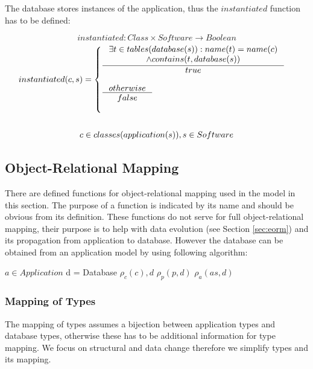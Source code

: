 \documentclass[11pt]{article}
\begin{document}
The database stores instances of the application, thus the $instantiated$ function has to be defined:

$$instantiated : Class \times Software \rightarrow Boolean $$ 
\begin{equation*}
\begin{gathered}
	instantiated(c, s) = \begin{cases}
 \inference{\exists t \in tables(database(s)) : name(t) = name(c) \\ \wedge contains(t, database(s))}{true} \\ \\
  \inference{otherwise}{false} \\ \\
 \end{cases} \\ \\
 c \in classes(application(s)), s \in Software 
\end{gathered}
\end{equation*}

\subsection{Object-Relational Mapping}
\label{sec:orm}
There are defined functions for object-relational mapping used in the model in this section. The purpose of a function is indicated by its name and should be obvious from its definition. These functions do not serve for full object-relational mapping, their purpose is to help with data evolution (see Section \ref{sec:eorm}) and its propagation from application to database. However the database can be obtained from an application model by using following algorithm:

\begin{algorithmic}[1]
	\Require $a \in Application$
	\State d = Database
		\State $\rho_c(c), d$
			\State $\rho_p(p, d)$
		\EndFor
	 \EndFor
			\State $\rho_{a}(as, d)$
		\EndFor
	\EndFor
\end{algorithmic}


\subsubsection{Mapping of Types}
The mapping of types assumes a bijection between application types and database types, otherwise these has to be additional information for type mapping. We focus on structural and data change therefore we simplify types and its mapping.
\end{document}
